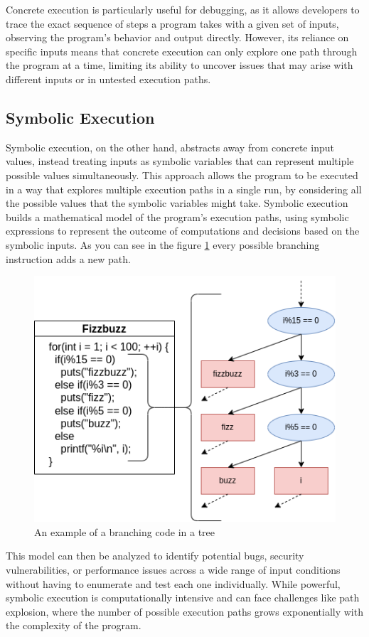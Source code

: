 Concrete execution is particularly useful for debugging, as it allows developers to trace the exact sequence of steps a program takes with a given set of inputs, observing the program's behavior and output directly.
However, its reliance on specific inputs means that concrete execution can only explore one path through the program at a time, limiting its ability to uncover issues that may arise with different inputs or in untested execution paths.

\subsection{Symbolic Execution}
Symbolic execution, on the other hand, abstracts away from concrete input values, instead treating inputs as symbolic variables that can represent multiple possible values simultaneously. 
This approach allows the program to be executed in a way that explores multiple execution paths in a single run, by considering all the possible values that the symbolic variables might take. 
Symbolic execution builds a mathematical model of the program's execution paths, using symbolic expressions to represent the outcome of computations and decisions based on the symbolic inputs. 
As you can see in the figure \ref{fig:sym_tree} every possible branching instruction adds a new path.
\begin{figure}[ht]
    \centering
    \includegraphics[width=0.8\linewidth]{figures/sym_trans}
    \caption[Branching in symbolic execution]{An example of a branching code in a tree}
    \label{fig:sym_tree}
\end{figure}

This model can then be analyzed to identify potential bugs, security vulnerabilities, or performance issues across a wide range of input conditions without having to enumerate and test each one individually. 
While powerful, symbolic execution is computationally intensive and can face challenges like path explosion, where the number of possible execution paths grows exponentially with the complexity of the program.

